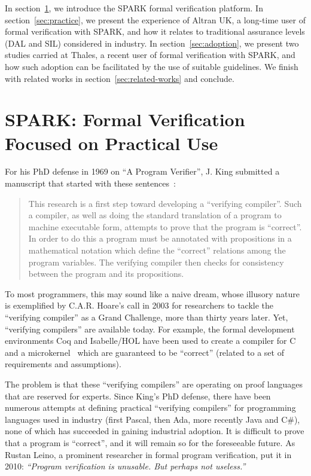 \documentclass{llncs}
\begin{document}
In section~\ref{sec:SPARK}, we introduce the SPARK formal verification
platform. In section~\ref{sec:practice}, we present the experience of Altran
UK, a long-time user of formal verification with SPARK, and how it relates to
traditional assurance levels (DAL and SIL) considered in industry. In
section~\ref{sec:adoption}, we present two studies carried at Thales, a recent
user of formal verification with SPARK, and how such adoption can be
facilitated by the use of suitable guidelines. We finish with related works in
section~\ref{sec:related-works} and conclude.

\section{SPARK: Formal Verification Focused on Practical Use}
\label{sec:SPARK}

For his PhD defense in 1969 on ``A Program Verifier'', J. King submitted a
manuscript that started with these sentences~\cite{King1970PhD}:

\begin{quote}
This research is a first step toward developing a ``verifying compiler''. Such
a compiler, as well as doing the standard translation of a program to machine
executable form, attempts to prove that the program is ``correct''. In order to
do this a program must be annotated with propositions in a mathematical
notation which define the ``correct'' relations among the program
variables. The verifying compiler then checks for consistency between the
program and its propositions.
\end{quote}

To most programmers, this may sound like a naive dream, whose illusory nature
is exemplified by C.A.R. Hoare’s call in 2003 for researchers to tackle the
``verifying compiler'' as a Grand Challenge, more than thirty years later. Yet,
``verifying compilers'' are available today. For example, the formal
development environments Coq and Isabelle/HOL have been used to create a
compiler for C~\cite{Leroy-backend} and a microkernel~\cite{Klein2009SOSP}
which are guaranteed to be ``correct'' (related to a set of requirements and
assumptions).

The problem is that these ``verifying compilers'' are operating on proof
languages that are reserved for experts. Since King's PhD defense, there have
been numerous attempts at defining practical ``verifying compilers'' for
programming languages used in industry (first Pascal, then Ada, more recently
Java and C\#), none of which has succeeded in gaining industrial adoption. It
is difficult to prove that a program is ``correct'', and it will remain so for
the foreseeable future. As Rustan Leino, a prominent researcher in formal
program verification, put it in 2010: \textit{``Program verification is
  unusable. But perhaps not useless.''}~\cite{Leino10usableauto-active}
\end{document}
